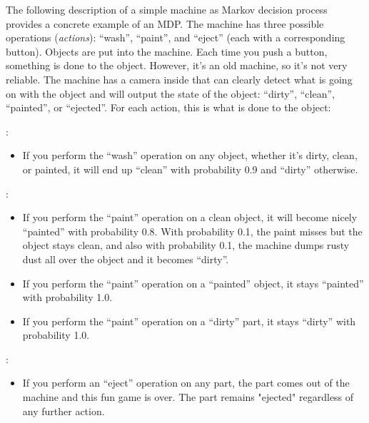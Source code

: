 \begin{examplebox}
  The following description of a simple machine as Markov decision
  process provides a concrete example of an MDP.
  The machine has three possible operations ({\em actions}): ``wash'',
  ``paint'', and ``eject'' (each with a corresponding button). Objects
  are put into the machine. Each time you push a button, something is
  done to the object. However, it's an old machine, so it's not very
  reliable. The machine has a camera inside that can clearly detect what
  is going on with the object and will output the state of the object:
  ``dirty'', ``clean'', ``painted'', or ``ejected''.  For each action,
  this is what is done to the object:

  :

  \begin{itemize}
    \item If you perform the ``wash'' operation on any object, whether
          it's dirty, clean, or painted, it will end up ``clean'' with
          probability 0.9 and ``dirty'' otherwise.
  \end{itemize}

  :

  \begin{itemize}
    \item If you perform the ``paint'' operation on a clean object, it
          will become nicely ``painted'' with probability 0.8. With
          probability 0.1, the paint misses but the object stays clean, and
          also with probability 0.1, the machine dumps rusty dust all over the
          object and it becomes ``dirty''.
    \item If you perform the ``paint'' operation on a ``painted'' object,
          it stays ``painted'' with probability 1.0.
    \item If you perform the ``paint'' operation on a ``dirty'' part, it
          stays ``dirty'' with probability 1.0.
  \end{itemize}

  :

  \begin{itemize}
    \item If you perform an ``eject'' operation on any part, the part
          comes out of the machine and this fun game is over. The part remains
          "ejected" regardless of any further action.
  \end{itemize}


\end{examplebox}

